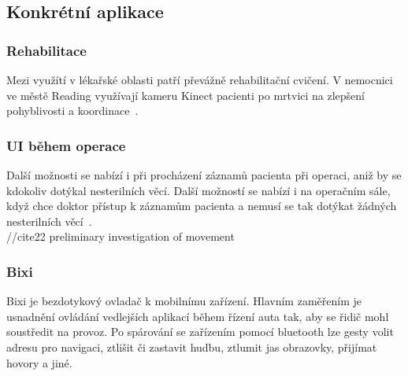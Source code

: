 \subsection{Konkrétní aplikace}
\subsubsection{Rehabilitace}
Mezi využítí v lékařské oblasti patří převážně rehabilitační cvičení. V nemocnici ve městě Reading využívají kameru Kinect pacienti po mrtvici na zlepšení pohyblivosti a koordinace~\cite{21}. 

\subsubsection{UI během operace}
Další možnosti se nabízí i při procházení záznamů pacienta při operaci, aniž by se kdokoliv dotýkal nesterilních věcí. Další možností se nabízí i na operačním sále, když chce doktor přístup k záznamům pacienta a nemusí se tak dotýkat žádných nesterilních věcí~\cite{24}.\\

//cite{22} preliminary investigation of movement

\subsubsection{Bixi}
Bixi je bezdotykový ovladač k mobilnímu zařízení. Hlavním zaměřením je usnadnění ovládání vedlejších aplikací během řízení auta tak, aby se řidič mohl soustředit na provoz. Po spárování se zařízením pomocí bluetooth lze gesty volit adresu pro navigaci, ztlišit či zastavit hudbu, ztlumit jas obrazovky, přijímat hovory a jiné.

\endinput

